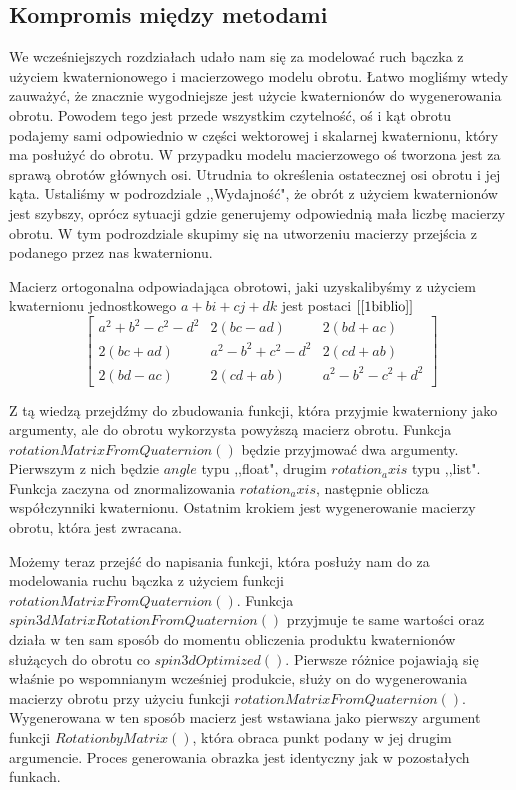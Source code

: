 \documentclass[a4paper,twoside,11pt,reqno]{mwrep}
\theoremstyle{plain} \newtheorem{twr}{Twierdzenie}
\theoremstyle{plain} \newtheorem{lem}{Lemat}
\theoremstyle{definition} \newtheorem{defi}{Definicja}
\theoremstyle{remark} \newtheorem*{wni}{Wniosek}
\theoremstyle{definition} \newtheorem{uwaga}{Uwaga}
\theoremstyle{definition}\newtheorem{prz}{Przykład}
\begin{document}
\subsection{Kompromis między metodami}
We wcześniejszych rozdziałach udało nam się za modelować ruch bączka z użyciem 
kwaternionowego i macierzowego modelu obrotu. Łatwo mogliśmy wtedy zauważyć, że znacznie wygodniejsze
jest użycie kwaternionów do wygenerowania obrotu. Powodem tego jest przede wszystkim czytelność,
oś i kąt obrotu podajemy sami odpowiednio w części wektorowej i skalarnej kwaternionu, który ma posłużyć 
do obrotu. W przypadku modelu macierzowego oś tworzona jest za sprawą obrotów głównych osi. Utrudnia to 
określenia ostatecznej osi obrotu i jej kąta. Ustaliśmy w podrozdziale ,,Wydajność", że obrót
z użyciem kwaternionów jest szybszy, oprócz sytuacji gdzie generujemy odpowiednią mała liczbę
macierzy obrotu. W tym podrozdziale skupimy się na utworzeniu macierzy przejścia z podanego 
przez nas kwaternionu.

Macierz ortogonalna odpowiadająca obrotowi, jaki uzyskalibyśmy z użyciem kwaternionu jednostkowego $a+bi+cj+dk$ jest postaci $[\ref{1biblio}]$
$$\begin{bmatrix}
a^2+b^2 -c^2-d^2 & 2(bc-ad) & 2(bd+ac)\\
2(bc+ad) & a^2-b^2 +c^2-d^2 & 2(cd+ab)\\
2(bd-ac) & 2(cd+ab) & a^2-b^2 -c^2+d^2
\end{bmatrix}$$

Z tą wiedzą przejdźmy do zbudowania funkcji, która przyjmie kwaterniony jako argumenty, ale
do obrotu wykorzysta powyższą macierz obrotu. Funkcja $rotationMatrixFromQuaternion()$
będzie przyjmować dwa argumenty. Pierwszym z nich będzie $angle$ typu ,,float", 
drugim $rotation_axis$ typu ,,list". Funkcja zaczyna od znormalizowania 
$rotation_axis$, następnie oblicza współczynniki kwaternionu. Ostatnim krokiem jest wygenerowanie macierzy obrotu, która jest zwracana.
  

Możemy teraz przejść do napisania funkcji, która posłuży nam do za modelowania ruchu bączka   
z użyciem funkcji $rotationMatrixFromQuaternion()$. Funkcja\\  
$spin3dMatrixRotationFromQuaternion()$ przyjmuje te same wartości oraz działa w ten sam sposób do 
momentu obliczenia produktu kwaternionów służących do obrotu co $spin3dOptimized()$.
Pierwsze różnice pojawiają się właśnie po wspomnianym wcześniej produkcie, służy on do wygenerowania
macierzy obrotu przy użyciu funkcji $rotationMatrixFromQuaternion()$. Wygenerowana w ten sposób macierz
jest wstawiana jako pierwszy argument funkcji $RotationbyMatrix()$, która obraca punkt podany w jej 
drugim argumencie. Proces generowania obrazka jest identyczny jak w pozostałych funkach.
\end{document}

